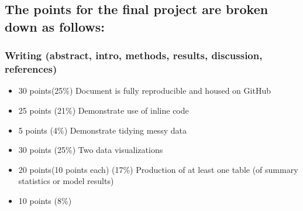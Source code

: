 \documentclass[man,floatsintext]{apa6}
\providecommand{\tightlist}{%
  \setlength{\itemsep}{0pt}\setlength{\parskip}{0pt}}
\begin{document}
\hypertarget{the-points-for-the-final-project-are-broken-down-as-follows}{%
\subsection{The points for the final project are broken down as follows:}\label{the-points-for-the-final-project-are-broken-down-as-follows}}

\hypertarget{writing-abstract-intro-methods-results-discussion-references}{%
\subsubsection{Writing (abstract, intro, methods, results, discussion, references)}\label{writing-abstract-intro-methods-results-discussion-references}}

\begin{itemize}
\tightlist
\item
  30 points(25\%) Document is fully reproducible and housed on GitHub
\item
  25 points (21\%) Demonstrate use of inline code
\item
  5 points (4\%) Demonstrate tidying messy data
\item
  30 points (25\%) Two data visualizations
\item
  20 points(10 points each) (17\%) Production of at least one table (of summary
  statistics or model results)
\item
  10 points (8\%)
\end{itemize}
\end{document}
